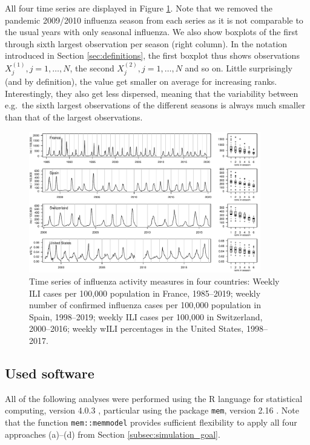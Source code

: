 \documentclass{article}
\begin{document}
All four time series are displayed in Figure \ref{fig:data}. Note that we removed the pandemic 2009/2010 influenza season from each series as it is not comparable to the usual years with only seasonal influenza. We also show boxplots of the first through sixth largest observation per season (right column). In the notation introduced in Section \ref{sec:definitions}, the first boxplot thus shows observations $X_j^{(1)}, j = 1, \dots, N$, the second $X_j^{(2)}, j = 1, \dots, N$ and so on. Little surprisingly (and by definition), the value get smaller on average for increasing ranks. Interestingly, they also get less dispersed, meaning that the variability between e.g.\ the sixth largest observations of the different seasons is always much smaller than that of the largest observations. 


\begin{figure}
\center
\includegraphics[width=0.9\textwidth]{figure/plot_data.pdf}
\caption{Time series of influenza activity measures in four countries: Weekly ILI cases per 100,000 population in France, 1985--2019; weekly number of confirmed influenza cases per 100,000 population in Spain, 1998--2019; weekly ILI cases per 100,000 in Switzerland, 2000--2016; weekly wILI percentages in the United States, 1998--2017.}
\label{fig:data}
\end{figure}

\subsection{Used software}

All of the following analyses were performed using the R language for statistical computing, version 4.0.3 \citep{RCT2020}, particular using the package \texttt{mem}, version 2.16 \cite{Lozano2020}. Note that the function \texttt{mem::memmodel} provides sufficient flexibility to apply all four approaches (a)--(d) from Section \ref{subsec:simulation_goal}. 
\end{document}
